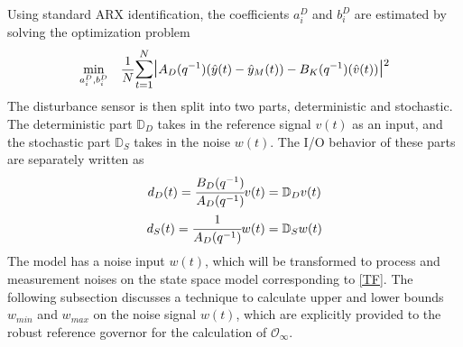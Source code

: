 \documentclass[letterpaper, 10 pt, conference]{ieeeconf}  %
\begin{document}
\begin{enumerate}
	Using standard ARX identification, the coefficients $a_i^D$ and $b_i^D$ are estimated by solving the optimization problem
	\begin{equation}
	\begin{aligned}
	& \underset{a_i^D,b_i^D}{\text{min}}
	& & \frac{1}{N}\mathlarger{\sum\limits_{t=1}^N}\mathlarger{\mathlarger{|}}A_D(q^{-1})(\hat{y}(t)-\hat{y}_M(t))-B_K(q^{-1})(\hat{v}(t))\mathlarger{\mathlarger{|}}^2 \\
	\end{aligned}
	\label{DSensor}
	\end{equation}
	The disturbance sensor is then split into two parts, deterministic and stochastic. The deterministic part $\mathbb{D}_D$ takes in the reference signal $v(t)$ as an input, and the stochastic part $\mathbb{D}_S$ takes in the noise $w(t)$. The I/O behavior of these parts are separately written as 
	\begin{equation*}
	\begin{matrix}
	d_D(t) = \cfrac{B_D(q^{-1})}{A_D(q^{-1})}v(t) = \mathbb{D}_D v(t) \vspace{4pt} \\  
	d_S(t) = \cfrac{1}{A_D(q^{-1})}w(t) = \mathbb{D}_S w(t)
	\end{matrix}
	\end{equation*}
	The model has a noise input $w(t)$, which will be transformed to process and measurement noises on the state space model corresponding to \eqref{TF}. The following subsection discusses a technique to calculate upper and lower bounds $w_{min}$ and $w_{max}$ on the noise signal $w(t)$, which are explicitly provided to the robust reference governor for the calculation of $\mathcal{O}_{\infty}$.

\end{enumerate}
\end{document}
